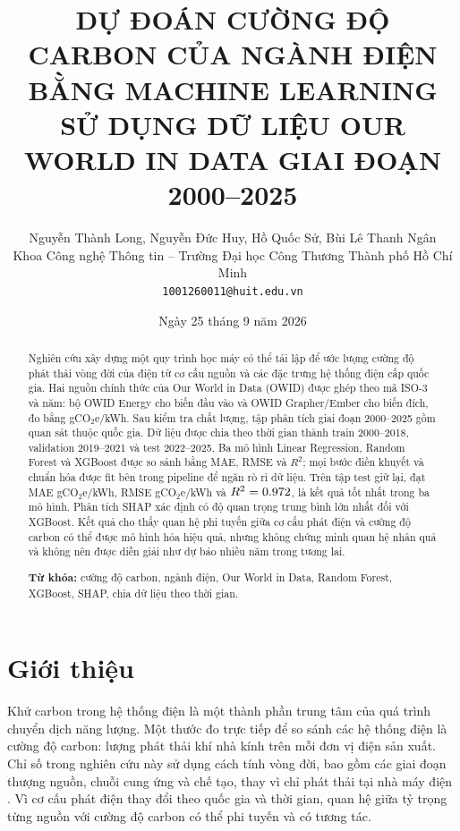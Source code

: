 \documentclass[11pt,a4paper]{article}
\title{\textbf{DỰ ĐOÁN CƯỜNG ĐỘ CARBON CỦA NGÀNH ĐIỆN BẰNG MACHINE LEARNING SỬ DỤNG DỮ LIỆU OUR WORLD IN DATA GIAI ĐOẠN 2000--2025}}
\author{
  Nguyễn Thành Long, Nguyễn Đức Huy, Hồ Quốc Sử, Bùi Lê Thanh Ngân\\
  Khoa Công nghệ Thông tin -- Trường Đại học Công Thương Thành phố Hồ Chí Minh\\
  \texttt{1001260011@huit.edu.vn}
}
\date{Ngày 25 tháng 9 năm 2026}
\begin{document}
\maketitle

\begin{abstract}
Nghiên cứu xây dựng một quy trình học máy có thể tái lập để ước lượng cường độ
phát thải vòng đời của điện từ cơ cấu nguồn và các đặc trưng hệ thống điện cấp
quốc gia. Hai nguồn chính thức của Our World in Data (OWID) được ghép theo mã
ISO-3 và năm: bộ OWID Energy cho biến đầu vào và OWID Grapher/Ember cho biến
đích, đo bằng gCO$_2$e/kWh. Sau kiểm tra chất lượng, tập phân tích giai đoạn
2000--2025 gồm \DatasetRows{} quan sát thuộc \DatasetCountries{} quốc gia. Dữ
liệu được chia theo thời gian thành train 2000--2018, validation 2019--2021 và
test 2022--2025. Ba mô hình Linear Regression, Random Forest và XGBoost được so
sánh bằng MAE, RMSE và $R^2$; mọi bước điền khuyết và chuẩn hóa được fit bên
trong pipeline để ngăn rò rỉ dữ liệu. Trên tập test giữ lại, \BestModel{} đạt
MAE \BestTestMAE{} gCO$_2$e/kWh, RMSE \BestTestRMSE{} gCO$_2$e/kWh và
$R^2=0.972$, là kết quả tốt nhất trong ba mô hình. Phân tích SHAP
xác định \TopSHAPFeature{} có độ quan trọng trung bình lớn nhất đối với XGBoost.
Kết quả cho thấy quan hệ phi tuyến giữa cơ cấu phát điện và cường độ carbon có
thể được mô hình hóa hiệu quả, nhưng không chứng minh quan hệ nhân quả và không
nên được diễn giải như dự báo nhiều năm trong tương lai.

\vspace{0.5em}
\noindent\textbf{Từ khóa:} cường độ carbon, ngành điện, Our World in Data,
Random Forest, XGBoost, SHAP, chia dữ liệu theo thời gian.
\end{abstract}

\section{Giới thiệu}

Khử carbon trong hệ thống điện là một thành phần trung tâm của quá trình chuyển
dịch năng lượng. Một thước đo trực tiếp để so sánh các hệ thống điện là cường độ
carbon: lượng phát thải khí nhà kính trên mỗi đơn vị điện sản xuất. Chỉ số trong
nghiên cứu này sử dụng cách tính vòng đời, bao gồm các giai đoạn thượng nguồn,
chuỗi cung ứng và chế tạo, thay vì chỉ phát thải tại nhà máy điện
\cite{owid-carbon-intensity}. Vì cơ cấu phát điện thay đổi theo quốc gia và thời
gian, quan hệ giữa tỷ trọng từng nguồn với cường độ carbon có thể phi tuyến và
có tương tác.
\end{document}
